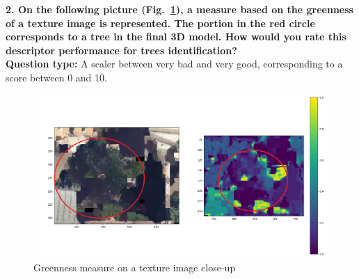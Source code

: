 \documentclass{kththesis}
\begin{document}
\textbf{2. On the following picture (Fig.~\ref{fig:greenness_closeup}), a measure based on the greenness of a texture image is represented. The portion in the red circle corresponds to a tree in the final 3D model. How would you rate this descriptor performance for trees identification? } \\

\textbf{Question type:} A scaler between very bad and very good, corresponding to a score between 0 and 10. 

\begin{figure}[H]
    \centering
    \includegraphics[width=\textwidth]{images/Results/MRF_survey/greenness_closeup.png}
    \caption{Greenness measure on a texture image close-up}
    \label{fig:greenness_closeup}
\end{figure}
\end{document}
